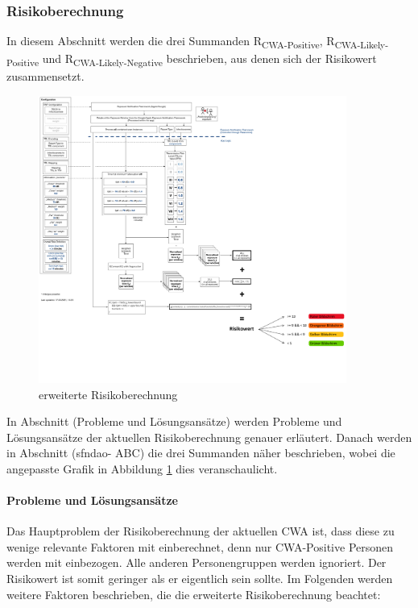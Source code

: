 \documentclass[conference]{IEEEtran}
\begin{document}
\subsubsection{Risikoberechnung}


In diesem Abschnitt werden die drei Summanden R\textsubscript{CWA-Positive}, R\textsubscript{CWA-Likely-Positive} und R\textsubscript{CWA-Likely-Negative} beschrieben, aus denen sich der Risikowert zusammensetzt.

\begin{figure}[h]
	\centering
	\includegraphics[width=0.9\textwidth]{"RiskCalculation"}
	\caption{erweiterte Risikoberechnung}
	\label{ErweiterteRisikoberechnung_Abbildung}
\end{figure}

In Abschnitt (Probleme und Lösungsansätze) werden Probleme und Lösungsansätze der aktuellen Risikoberechnung genauer erläutert.
Danach werden in Abschnitt (sfndao- ABC) die drei Summanden näher beschrieben, wobei die angepasste Grafik in Abbildung \ref{ErweiterteRisikoberechnung_Abbildung} dies veranschaulicht.

\paragraph{Probleme und Lösungsansätze}

Das Hauptproblem der Risikoberechnung der aktuellen CWA ist, dass diese zu wenige relevante Faktoren mit einberechnet, denn nur CWA-Positive Personen werden mit einbezogen.
Alle anderen Personengruppen werden ignoriert. Der Risikowert ist somit geringer als er eigentlich sein sollte. Im Folgenden werden weitere Faktoren beschrieben, die die erweiterte Risikoberechnung beachtet:
\end{document}
